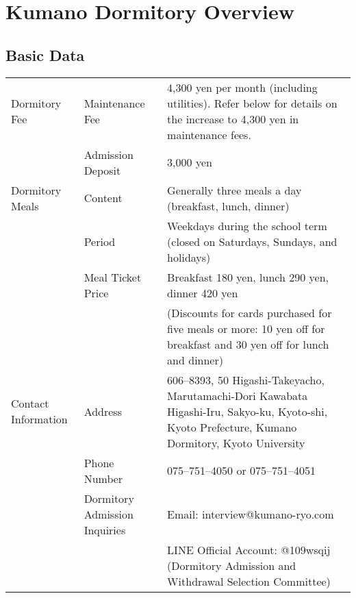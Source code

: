 \section{Kumano Dormitory Overview} \label{sec:abst}

		\subsection{Basic Data} \label{subsec:data}
		\begin{table}[htbp]
      \begin{tabular}{|l|l|l|}
      \hline
      Dormitory Fee\index{りょうひ@Dormitory Fee|seealsopage{Maintenance Fee}}  & Maintenance Fee\index{いじひ@Maintenance Fee|seealsopage{Dormitory Fee}}    & 4,300 yen per month (including utilities). Refer below for details on the increase to 4,300 yen in maintenance fees. \\
          & Admission Deposit  & 3,000 yen                                                       \\ \hline
      Dormitory Meals\index{りょうしょく@Dormitory Meals}  & Content     & Generally three meals a day (breakfast, lunch, dinner)                                                   \\
          & Period     & Weekdays during the school term (closed on Saturdays, Sundays, and holidays)                \\
          & Meal Ticket Price\index{りょうしょく@Dormitory Meals!のねだん@---Price}    & Breakfast 180 yen, lunch 290 yen, dinner 420 yen \\
         　&　& (Discounts for cards purchased for five meals or more: 10 yen off for breakfast and 30 yen off for lunch and dinner)         \\ \hline
      Contact Information\index{くまのりょう@Kumano Dormitory!のれんらくさき@---Contact Information}
       & Address\index{くまのりょう@Kumano Dormitory!のじゅうしょ@---Address}   & 606--8393, 50 Higashi-Takeyacho, Marutamachi-Dori Kawabata Higashi-Iru, Sakyo-ku, Kyoto-shi, Kyoto Prefecture, Kumano Dormitory, Kyoto University                     \\
          & Phone Number   & 075--751--4050 or 075--751--4051                                \\
          & Dormitory Admission Inquiries\index{にゅうりょう@Dormitory Admission!にかんするといあわせ@---Inquiries} & Email: interview@kumano-ryo.com \\
          　&　& LINE Official Account: @109wsqij (Dormitory Admission and Withdrawal Selection Committee) \\ \hline
      \end{tabular}
      \end{table}
